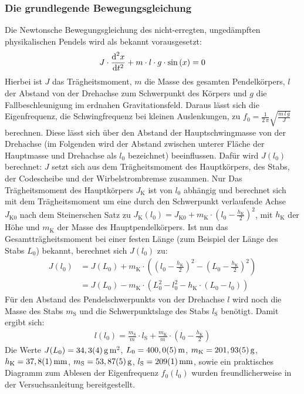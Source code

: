 \documentclass[numbers=noenddot,12pt,a4paper]{scrartcl}
\newcommand{\diff}{\textnormal{d}}
\newcommand{\ix}[1]{_\text{#1}}
\begin{document}
\subsubsection{Die grundlegende Bewegungsgleichung}
Die Newtonsche Bewegungsgleichung des nicht-erregten, ungedämpften physikalischen Pendels wird als bekannt vorausgesetzt:
\begin{align}
J\cdot\frac{\diff^2 x}{\diff t^2}+m\cdot l\cdot g\cdot\sin\left(x\right)=0\label{eq:bew1}
\end{align}
Hierbei ist $J$ das Trägheitsmoment, $m$ die Masse des gesamten Pendelkörpers, $l$ der Abstand von der Drehachse zum Schwerpunkt des Körpers und $g$ die Fallbeschleunigung im erdnahen Gravitationsfeld. Daraus lässt sich die Eigenfrequenz, die Schwingfrequenz bei kleinen Auslenkungen, zu $f\ix{0}=\frac{1}{2\,\pi}\sqrt{\frac{m\,l\,g}{J}}$ berechnen. Diese lässt sich über den Abstand der Hauptschwingmasse von der Drehachse (im Folgenden wird der Abstand zwischen unterer Fläche der Hauptmasse und Drehachse als $l\ix{0}$ bezeichnet) beeinflussen. Dafür wird $J(l\ix{0})$ berechnet: $J$ setzt sich aus dem Trägheitsmoment des Hauptkörpers, des Stabs, der Codescheibe und der Wirbelstrombremse zusammen. Nur Das Trägheitsmoment des Hauptkörpers $J\ix{K}$ ist von $l\ix{0}$ abhängig und berechnet sich mit dem Trägheitsmoment um eine durch den Schwerpunkt verlaufende Achse $J\ix{K0}$ nach dem Steinerschen Satz zu $J\ix{K}(l\ix{0})=J\ix{K0}+ m\ix{K}\cdot\left(l\ix{0}-\frac{h\ix{K}}{2}\right)^2$, mit $h\ix{K}$ der Höhe und $m\ix{K}$ der Masse des Hauptpendelkörpers. Ist nun das Gesamtträgheitsmoment bei einer festen Länge (zum Beispiel der Länge des Stabs $L\ix{0}$) bekannt, berechnet sich $J(l\ix{0})$ zu:
\begin{align}
	J(l\ix{0})&=J(L\ix{0})+m\ix{K}\cdot\left(\left(l\ix{0}-\frac{h\ix{K}}{2}\right)^2-\left(L\ix{0}-\frac{h\ix{K}}{2}\right)^2\right)\nonumber\\
	&=J(L\ix{0})-m\ix{K}\cdot\left(L\ix{0}^2-l\ix{0}^2-h\ix{K}\cdot\left(L\ix{0}-l\ix{0}\right)\right)
\end{align}
Für den Abstand des Pendelschwerpunkts von der Drehachse $l$ wird noch die Masse des Stabs $m\ix{S}$ und die Schwerpunktslage des Stabs $l\ix{S}$ benötigt. Damit ergibt sich:
\begin{align}
	l(l\ix{0})=\frac{m\ix{S}}{m}\cdot l\ix{S}+\frac{m\ix{K}}{m}\cdot\left(l\ix{0}-\frac{h\ix{K}}{2}\right)
\end{align}
Die Werte $J(L\ix{0})=\unit[34,3(4)]{g\,m^2}$, $L\ix{0}=\unit[400,0(5)]{m}$, $m\ix{K}=\unit[201,93(5)]{g}$, $h\ix{K}=\unit[37,8(1)]{mm}$, $m\ix{S}=\unit[53,87(5)]{g}$, $l\ix{S}=\unit[209(1)]{mm}$, sowie ein praktisches Diagramm zum Ablesen der Eigenfrequenz $f\ix{0}(l\ix{0})$ wurden freundlicherweise in der Versuchsanleitung bereitgestellt.
\end{document}
